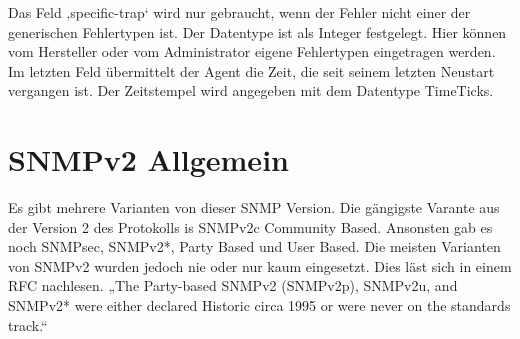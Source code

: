 \documentclass[11pt,a4paper]{article}
\begin{document}
Das Feld ‚specific-trap‘ wird nur gebraucht, wenn der Fehler nicht einer der generischen Fehlertypen ist. Der Datentype ist als Integer festgelegt. Hier können vom Hersteller oder vom Administrator eigene Fehlertypen eingetragen werden.\\
Im letzten Feld übermittelt der Agent die Zeit, die seit seinem letzten Neustart vergangen ist. Der Zeitstempel wird angegeben mit dem Datentype TimeTicks.\\

\section{SNMPv2 Allgemein}
Es gibt mehrere Varianten von dieser SNMP Version. Die gängigste Varante aus der Version 2 des Protokolls is SNMPv2c Community Based. Ansonsten gab es noch SNMPsec, SNMPv2*, Party Based und User Based. Die meisten Varianten von SNMPv2 wurden jedoch nie oder nur kaum eingesetzt. Dies läst sich in einem RFC nachlesen. „The Party-based SNMPv2 (SNMPv2p), SNMPv2u, and SNMPv2* were either declared Historic circa 1995 or were never on the standards track.“ \cite{rfcSnmpNotUsed}
\end{document}
